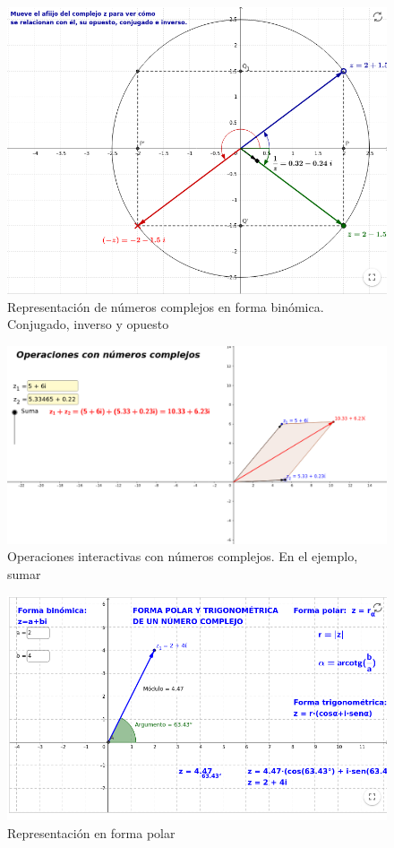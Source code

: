 \documentclass[../main.tex]{memoir}
\begin{document}
\begin{figure}[H]
	\centering
	\includegraphics[scale=0.3]{images/conjugado.png}
	\caption{Representación de números complejos en forma binómica. Conjugado, inverso y opuesto}
	\label{geogebra1}
\end{figure}

\begin{figure}[H]
	\centering
	\includegraphics[scale=0.25]{images/sumar.png}
	\caption{Operaciones interactivas con números complejos. En el ejemplo, sumar}
	\label{geogebra2}
\end{figure}


\begin{figure}[H]
	\centering
	\includegraphics[scale=0.3]{images/polar.png}
	\caption{Representación en forma polar}
	\label{geogebra3}
\end{figure}
\end{document}
